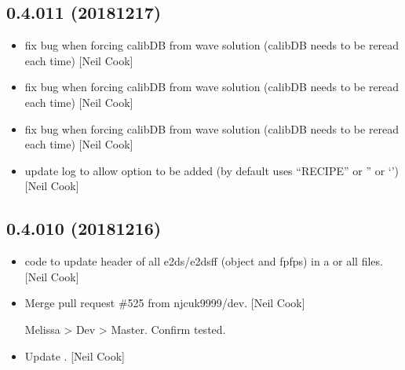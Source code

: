 \documentclass[a4paper,10pt,english]{report}
\begin{document}
\subsection{0.4.011 (2018\sphinxhyphen{}12\sphinxhyphen{}17)}
\label{\detokenize{misc/changelog:id249}}\begin{itemize}
\item {} 
 \sphinxhyphen{} fix bug when forcing calibDB from wave
solution (calibDB needs to be re\sphinxhyphen{}read each time) {[}Neil Cook{]}

\item {} 
 \sphinxhyphen{} fix bug when forcing calibDB from wave
solution (calibDB needs to be re\sphinxhyphen{}read each time) {[}Neil Cook{]}

\item {} 
 \sphinxhyphen{} fix bug when forcing calibDB from wave
solution (calibDB needs to be re\sphinxhyphen{}read each time) {[}Neil Cook{]}

\item {} 
 \sphinxhyphen{} update log to allow option to be added (by default uses
“RECIPE” or ” or ‘’) {[}Neil Cook{]}

\end{itemize}


\subsection{0.4.010 (2018\sphinxhyphen{}12\sphinxhyphen{}16)}
\label{\detokenize{misc/changelog:id250}}\begin{itemize}
\item {} 
 \sphinxhyphen{} code to update header of all e2ds/e2dsff
(object and fpfps) in a  or all files. {[}Neil Cook{]}

\item {} 
Merge pull request \#525 from njcuk9999/dev. {[}Neil Cook{]}

Melissa \textendash{}\textgreater{} Dev \textendash{}\textgreater{} Master. Confirm tested.

\item {} 
Update . {[}Neil Cook{]}

\end{itemize}
\end{document}
